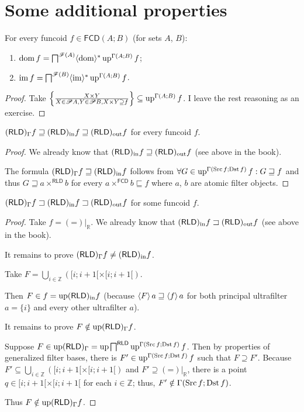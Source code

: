 \section{Some additional properties}
\begin{prop}
For every funcoid $f\in\mathsf{FCD}(A;B)$ (for sets $A$, $B$):
\begin{enumerate}
\item $\operatorname{dom} f=\bigsqcap^{\mathscr{F}(A)}\langle\operatorname{dom}\rangle^{\ast}\operatorname{up}^{\Gamma(A;B)}f$;
\item $\operatorname{im} f=\bigsqcap^{\mathscr{F}(B)}\langle\operatorname{im}\rangle^{\ast}\operatorname{up}^{\Gamma(A;B)}f$.
\end{enumerate}
\end{prop}
\begin{proof}
Take $\left\{ \frac{X\times Y}{X\in\mathscr{P} A,Y\in\mathscr{P} B,X\times Y\supseteq f}\right\}\subseteq\operatorname{up}^{\Gamma(A;B)}f$.
I leave the rest reasoning as an exercise.\end{proof}
\begin{prop}
$(\mathsf{RLD})_{\Gamma}f\sqsupseteq(\mathsf{RLD})_{\mathrm{in}} f\sqsupseteq(\mathsf{RLD})_{\mathrm{out}} f$
for every funcoid $f$.\end{prop}
\begin{proof}
We already know that $(\mathsf{RLD})_{\mathrm{in}} f\sqsupseteq(\mathsf{RLD})_{\mathrm{out}} f$ (see above
in the book).

The formula $(\mathsf{RLD})_{\Gamma}f\sqsupseteq(\mathsf{RLD})_{\mathrm{in}} f$ follows
from $\forall G\in\operatorname{up}^{\Gamma(\operatorname{Src} f;\operatorname{Dst} f)}f:G\sqsupseteq f$
and thus $G\sqsupseteq a\times^{\mathsf{RLD}}b$ for every $a\times^{\mathsf{FCD}}b\sqsubseteq f$ where $a$, $b$ are atomic filter objects.\end{proof}
\begin{example}
\label{three-rld}$(\mathsf{RLD})_{\Gamma}f\sqsupset(\mathsf{RLD})_{\mathrm{in}} f\sqsupset(\mathsf{RLD})_{\mathrm{out}} f$
for some funcoid $f$.\end{example}
\begin{proof}
Take $f={(\mathord{=})}|_{\mathbb{R}}$. We already know that $(\mathsf{RLD})_{\mathrm{in}} f\sqsupset(\mathsf{RLD})_{\mathrm{out}} f$
(see above in the book).

It remains to prove $(\mathsf{RLD})_{\Gamma}f\neq(\mathsf{RLD})_{\mathrm{in}} f$.

Take $F=\bigcup_{i\in\mathbb{Z}}([i;i+1[\times[i;i+1[)$.

Then $F\in f=\operatorname{up}(\mathsf{RLD})_{\mathrm{in}} f$ (because $\left\langle F\right\rangle a\sqsupseteq\left\langle f\right\rangle a$
for both principal ultrafilter $a=\{i\}$ and every other ultrafilter
$a$).

It remains to prove $F\notin\operatorname{up}(\mathsf{RLD})_{\Gamma}f$.

Suppose $F\in\operatorname{up}(\mathsf{RLD})_{\Gamma}=\operatorname{up}\bigsqcap^{\mathsf{RLD}}\operatorname{up}^{\Gamma(\operatorname{Src} f;\operatorname{Dst} f)}f$.
Then by properties of generalized filter bases, there is $F'\in\operatorname{up}^{\Gamma(\operatorname{Src} f;\operatorname{Dst} f)}f$
such that $F\supseteq F'$. Because $F'\subseteq\bigcup_{i\in\mathbb{Z}}([i;i+1[\times[i;i+1[)$
and $F'\supseteq{(\mathord{=})}|_{\mathbb{R}}$, there is a point
$q\in[i;i+1[\times[i;i+1[$ for each $i\in\mathbb{Z}$; thus, $F'\notin\Gamma(\operatorname{Src} f;\operatorname{Dst} f)$.

Thus $F\notin\operatorname{up}(\mathsf{RLD})_{\Gamma}f$.\end{proof}
